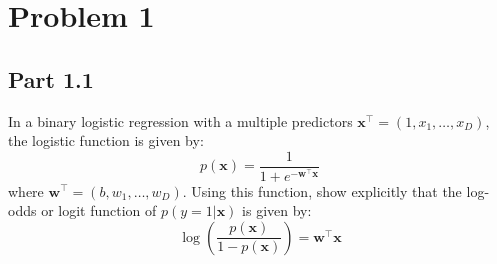 \documentclass[11pt,twoside]{article}
\newcommand{\pts}[1]{\marginpar{ \small\hspace{0pt} \textit{[#1]} } }
\newcommand{\lt}{\left}
\newcommand{\rt}{\right}
\newcommand{\?}{\stackrel{?}{=}}
\newcommand{\fr}{\frac}
\begin{document}



\section*{Problem 1 }

\subsection*{Part 1.1}
In a binary logistic regression with a multiple predictors $\bm x^\intercal = (1, x_1,\ldots,x_D)$, \pts{4}
the logistic function is given by:
\begin{equation}
  \label{eq:1}
  p(\bm x) = \fr{1}{1 + e^{-\bm w^\intercal \bm x}}
\end{equation}
where $\bm w^\intercal = (b, w_1, \ldots, w_D) $.
Using this function, show explicitly that the log-odds or logit function of $p(y=1|\bm x)$ is given by:
\begin{equation}
  \label{eq:2}
  \log\lt(\fr{p(\bm x)}{1 - p(\bm x)}\rt) = \bm w^\intercal \bm x
\end{equation}

\end{document}

